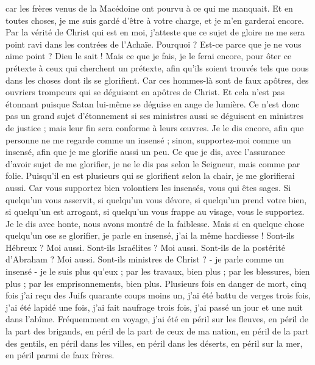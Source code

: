 \begin{multicols}{2}
car les frères venus de la Macédoine ont pourvu à ce qui me manquait. Et en toutes choses, je me suis gardé d’être à votre charge, et je m'en garderai encore.
Par la vérité de Christ qui est en moi, j’atteste que ce sujet de gloire ne me sera point ravi dans les contrées de l'Achaïe.
Pourquoi ? Est-ce parce que je ne vous aime point ? Dieu le sait !
Mais ce que je fais, je le ferai encore, pour ôter ce prétexte à ceux qui cherchent un prétexte, afin qu’ils soient trouvés tels que nous dans les choses dont ils se glorifient.
Car ces hommes-là sont de faux apôtres, des ouvriers trompeurs qui se déguisent en apôtres de Christ.
Et cela n'est pas étonnant puisque Satan lui-même se déguise en ange de lumière.
Ce n'est donc pas un grand sujet d'étonnement si ses ministres aussi se déguisent en ministres de justice ; mais leur fin sera conforme à leurs œuvres.
Je le dis encore, afin que personne ne me regarde comme un insensé ; sinon, supportez-moi comme un insensé, afin que je me glorifie aussi un peu.
Ce que je dis, avec l’assurance d’avoir sujet de me glorifier, je ne le dis pas selon le Seigneur, mais comme par folie.
Puisqu’il en est plusieurs qui se glorifient selon la chair, je me glorifierai aussi.
Car vous supportez bien volontiers les insensés, vous qui êtes sages.
Si quelqu'un vous asservit, si quelqu'un vous dévore, si quelqu'un prend votre bien, si quelqu'un est arrogant, si quelqu'un vous frappe au visage, vous le supportez.
Je le dis avec honte, nous avons montré de la faiblesse. Mais si en quelque chose quelqu'un ose se glorifier, je parle en insensé, j'ai la même hardiesse !
Sont-ils Hébreux ? Moi aussi. Sont-ils Israélites ? Moi aussi. Sont-ils de la postérité d'Abraham ? Moi aussi.
Sont-ils ministres de Christ ? - je parle comme un insensé - je le suis plus qu'eux ; par les travaux, bien plus ; par les blessures, bien plus ; par les emprisonnements, bien plus. Plusieurs fois en danger de mort,
cinq fois j’ai reçu des Juifs quarante coups moins un,
j'ai été battu de verges trois fois, j'ai été lapidé une fois, j'ai fait naufrage trois fois, j'ai passé un jour et une nuit dans l’abîme.
Fréquemment en voyage, j’ai été en péril sur les fleuves, en péril de la part des brigands, en péril de la part de ceux de ma nation, en péril de la part des gentils, en péril dans les villes, en péril dans les déserts, en péril sur la mer, en péril parmi de faux frères.

\end{multicols}
